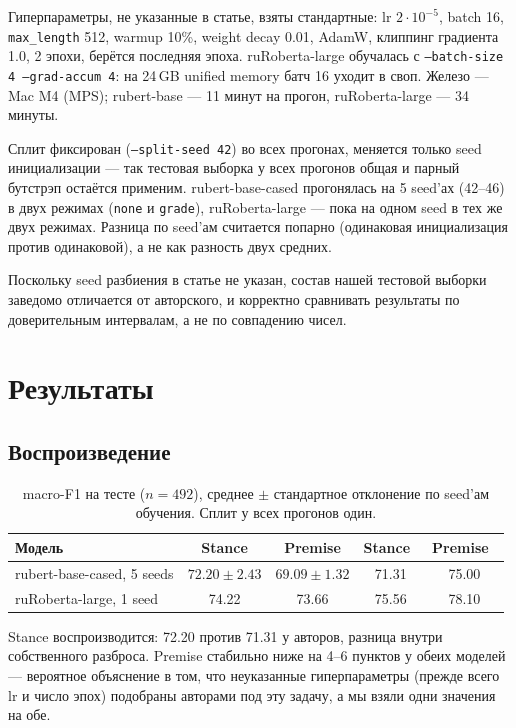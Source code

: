 \documentclass{article}
\begin{document}
Гиперпараметры, не указанные в статье, взяты стандартные: lr $2 \cdot 10^{-5}$,
batch 16, \texttt{max\_length} 512, warmup 10\%, weight decay 0.01, AdamW, клиппинг
градиента 1.0, 2 эпохи, берётся последняя эпоха. ruRoberta-large обучалась с
\texttt{--batch-size 4 --grad-accum 4}: на 24\,GB unified memory батч 16 уходит в своп.
Железо --- Mac M4 (MPS); rubert-base --- 11 минут на прогон, ruRoberta-large --- 34 минуты.

Сплит фиксирован (\texttt{--split-seed 42}) во всех прогонах, меняется только seed
инициализации --- так тестовая выборка у всех прогонов общая и парный бутстрэп остаётся
применим. rubert-base-cased прогонялась на 5 seed'ах (42--46) в двух режимах
(\texttt{none} и \texttt{grade}), ruRoberta-large --- пока на одном seed в тех же двух
режимах. Разница по seed'ам считается попарно (одинаковая инициализация против
одинаковой), а не как разность двух средних.

Поскольку seed разбиения в статье не указан, состав нашей тестовой выборки заведомо
отличается от авторского, и корректно сравнивать результаты по доверительным интервалам,
а не по совпадению чисел.

\section{Результаты}
\label{sec:results}

\subsection{Воспроизведение}

\begin{table}[!tbh]
\centering
\begin{tabular}{lcccc}
\toprule
Модель & Stance & Premise & Stance~\cite{serbina2026argument} & Premise~\cite{serbina2026argument} \\
\midrule
rubert-base-cased, 5 seeds & $72.20 \pm 2.43$ & $69.09 \pm 1.32$ & 71.31 & 75.00 \\
ruRoberta-large, 1 seed    & 74.22            & 73.66            & 75.56 & 78.10 \\
\bottomrule
\end{tabular}
\caption{macro-F1 на тесте ($n=492$), среднее $\pm$ стандартное отклонение по seed'ам
обучения. Сплит у всех прогонов один.}
\label{tab:reproduction}
\end{table}

Stance воспроизводится: 72.20 против 71.31 у авторов, разница внутри собственного
разброса. Premise стабильно ниже на 4--6 пунктов у обеих моделей --- вероятное объяснение
в том, что неуказанные гиперпараметры (прежде всего lr и число эпох) подобраны авторами
под эту задачу, а мы взяли одни значения на обе.
\end{document}
